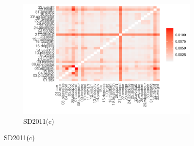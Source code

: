 \begin{figure}[ht]
  \begin{subfigure}{0.75\textwidth}
    \includegraphics[width=\linewidth]{../graphs/datasynthesizer/datasynthesizer_fidelity_twoway_sd2011_clean_small.pdf}
    \caption{SD2011(c)}
    \label{subfig:ds_fidelity_two_way_subfig-c}
  \end{subfigure}
\end{figure}

